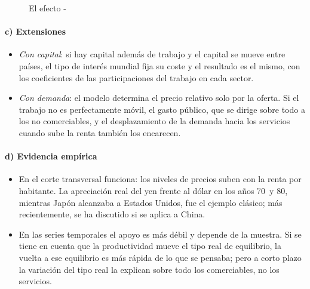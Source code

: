 \documentclass[11pt]{article}
\begin{document}
\begin{figure}[H]
\centering
\caption{El efecto -}\label{fig:balassa-samuelson}
\end{figure}

\paragraph{c) Extensiones}
\begin{itemize}
\item \emph{Con capital}: si hay capital además de trabajo y el capital se mueve entre países, el tipo de interés mundial fija su coste y el resultado es el mismo, con los coeficientes de las participaciones del trabajo en cada sector\nocite{ObstfeldRogoff1996Foundations}.
\item \emph{Con demanda}: el modelo determina el precio relativo solo por la oferta. Si el trabajo no es perfectamente móvil, el gasto público, que se dirige sobre todo a los no comerciables, y el desplazamiento de la demanda hacia los servicios cuando sube la renta también los encarecen\nocite{DeGregorioGiovanniniWolf1994International}.
\end{itemize}

\paragraph{d) Evidencia empírica}
\begin{itemize}
\item En el corte transversal funciona: los niveles de precios suben con la renta por habitante. La apreciación real del yen frente al dólar en los años 70~y 80, mientras Japón alcanzaba a Estados Unidos, fue el ejemplo clásico; más recientemente, se ha discutido si se aplica a China.
\item En las series temporales el apoyo es más débil y depende de la muestra. Si se tiene en cuenta que la productividad mueve el tipo real de equilibrio, la vuelta a ese equilibrio es más rápida de lo que se pensaba\nocite{ChongJordaTaylor2012Harrod}; pero a corto plazo la variación del tipo real la explican sobre todo los comerciables, no los servicios\nocite{Engel1999Accounting}.
\end{itemize}
\end{document}
